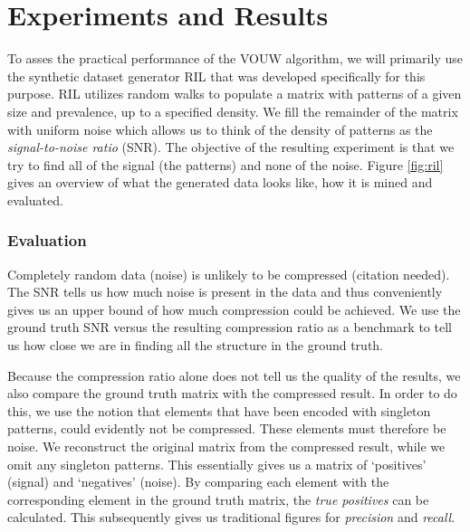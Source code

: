\documentclass{llncs}
\begin{document}
\section{Experiments and Results}

To asses the practical performance of the VOUW algorithm, we will primarily use the synthetic dataset generator RIL that was developed specifically for this purpose. RIL utilizes random walks to populate a matrix with patterns of a given size and prevalence, up to a specified density. We fill the remainder of the matrix with uniform noise which allows us to think of the density of patterns as the \emph{signal-to-noise ratio} (SNR). The objective of the resulting experiment is that we try to find all of the signal (the patterns) and none of the noise. Figure \ref{fig:ril} gives an overview of what the generated data looks like, how it is mined and evaluated.

\subsubsection{Evaluation}

Completely random data (noise) is unlikely to be compressed (citation needed). The SNR tells us how much noise is present in the data and thus conveniently gives us an upper bound of how much compression could be achieved. We use the ground truth SNR versus the resulting compression ratio as a benchmark to tell us how close we are in finding all the structure in the ground truth. 

Because the compression ratio alone does not tell us the quality of the results, we also compare the ground truth matrix with the compressed result. In order to do this, we use the notion that elements that have been encoded with singleton patterns, could evidently not be compressed. These elements must therefore be noise. We reconstruct the original matrix from the compressed result, while we omit any singleton patterns. This essentially gives us a matrix of `positives' (signal) and `negatives' (noise). By comparing each element with the corresponding element in the ground truth matrix, the \emph{true positives} can be calculated. This subsequently gives us traditional figures for \emph{precision} and \emph{recall}.
\end{document}
